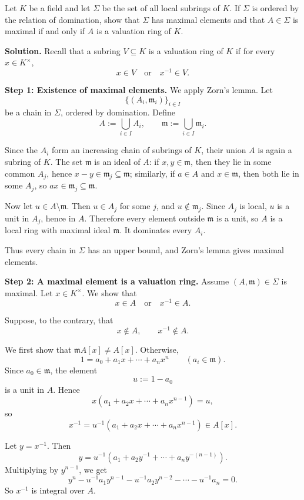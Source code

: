 \documentclass[12pt,a4paper]{article}
\theoremstyle{plain}
\theoremstyle{definition}      %
\begin{document}
Let \(K\) be a field and let \(\Sigma\) be the set of all local subrings of \(K\). If \(\Sigma\) is ordered by the relation of domination, show that \(\Sigma\) has maximal elements and that \(A\in\Sigma\) is maximal if and only if \(A\) is a valuation ring of \(K\).

\textbf{Solution.}
Recall that a subring \(V\subseteq K\) is a valuation ring of \(K\) if for every \(x\in K^\times\),
\[
x\in V \quad\text{or}\quad x^{-1}\in V.
\]

\textbf{Step 1: Existence of maximal elements.}
We apply Zorn's lemma. Let
\[
\{(A_i,\mathfrak m_i)\}_{i\in I}
\]
be a chain in \(\Sigma\), ordered by domination. Define
\[
A:=\bigcup_{i\in I} A_i,
\qquad
\mathfrak m:=\bigcup_{i\in I}\mathfrak m_i.
\]

Since the \(A_i\) form an increasing chain of subrings of \(K\), their union \(A\) is again a subring of \(K\). The set \(\mathfrak m\) is an ideal of \(A\): if \(x,y\in \mathfrak m\), then they lie in some common \(A_j\), hence \(x-y\in \mathfrak m_j\subseteq \mathfrak m\); similarly, if \(a\in A\) and \(x\in \mathfrak m\), then both lie in some \(A_j\), so \(ax\in \mathfrak m_j\subseteq \mathfrak m\).

Now let \(u\in A\setminus \mathfrak m\). Then \(u\in A_j\) for some \(j\), and \(u\notin \mathfrak m_j\). Since \(A_j\) is local, \(u\) is a unit in \(A_j\), hence in \(A\). Therefore every element outside \(\mathfrak m\) is a unit, so \(A\) is a local ring with maximal ideal \(\mathfrak m\). It dominates every \(A_i\).

Thus every chain in \(\Sigma\) has an upper bound, and Zorn's lemma gives maximal elements.

\medskip

\textbf{Step 2: A maximal element is a valuation ring.}
Assume \((A,\mathfrak m)\in \Sigma\) is maximal. Let \(x\in K^\times\). We show that
\[
x\in A \quad\text{or}\quad x^{-1}\in A.
\]

Suppose, to the contrary, that
\[
x\notin A,\qquad x^{-1}\notin A.
\]

We first show that \(\mathfrak m A[x]\neq A[x]\). Otherwise,
\[
1=a_0+a_1x+\cdots+a_nx^n
\qquad (a_i\in \mathfrak m).
\]
Since \(a_0\in \mathfrak m\), the element
\[
u:=1-a_0
\]
is a unit in \(A\). Hence
\[
x(a_1+a_2x+\cdots+a_nx^{n-1})=u,
\]
so
\[
x^{-1}=u^{-1}(a_1+a_2x+\cdots+a_nx^{n-1})\in A[x].
\]

Let \(y=x^{-1}\). Then
\[
y=u^{-1}(a_1+a_2y^{-1}+\cdots+a_n y^{-(n-1)}).
\]
Multiplying by \(y^{n-1}\), we get
\[
y^n-u^{-1}a_1y^{n-1}-u^{-1}a_2y^{n-2}-\cdots-u^{-1}a_n=0.
\]
So \(x^{-1}\) is integral over \(A\).
\end{document}
